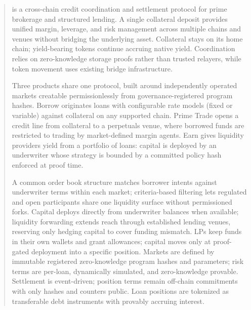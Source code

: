 \begin{abstract}
  \daloc{} is a cross-chain credit coordination and settlement protocol for prime brokerage and structured lending. A single collateral deposit provides unified margin, leverage, and risk management across multiple chains and venues without bridging the underlying asset. Collateral stays on its home chain; yield-bearing tokens continue accruing native yield. Coordination relies on zero-knowledge storage proofs rather than trusted relayers, while token movement uses existing bridge infrastructure.

  Three products share one protocol, built around independently operated markets creatable permissionlessly from governance-registered program hashes. Borrow originates loans with configurable rate models (fixed or variable) against collateral on any supported chain. Prime Trade opens a credit line from collateral to a perpetuals venue, where borrowed funds are restricted to trading by market-defined margin agents. Earn gives liquidity providers yield from a portfolio of loans: capital is deployed by an underwriter whose strategy is bounded by a committed policy hash enforced at proof time.

  A common order book structure matches borrower intents against underwriter terms within each market; criteria-based filtering lets regulated and open participants share one liquidity surface without permissioned forks. Capital deploys directly from underwriter balances when available; liquidity forwarding extends reach through established lending venues, reserving only hedging capital to cover funding mismatch. LPs keep funds in their own wallets and grant allowances; capital moves only at proof-gated deployment into a specific position. Markets are defined by immutable registered zero-knowledge program hashes and parameters; risk terms are per-loan, dynamically simulated, and zero-knowledge provable. Settlement is event-driven; position terms remain off-chain commitments with only hashes and counters public. Loan positions are tokenized as transferable debt instruments with provably accruing interest.
\end{abstract}
